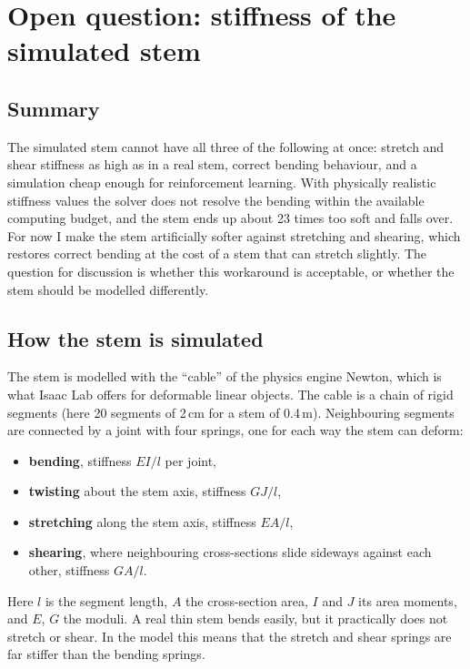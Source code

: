 \documentclass[11pt,a4paper]{article}
\begin{document}
\section{Open question: stiffness of the simulated stem}

\subsection{Summary}

The simulated stem cannot have all three of the following at once: stretch and shear stiffness as high as
in a real stem, correct bending behaviour, and a simulation cheap enough for reinforcement learning. With
physically realistic stiffness values the solver does not resolve the bending within the available
computing budget, and the stem ends up about 23 times too soft and falls over. For now I make the stem
artificially softer against stretching and shearing, which restores correct bending at the cost of a stem
that can stretch slightly. The question for discussion is whether this workaround is acceptable, or whether
the stem should be modelled differently.

\subsection{How the stem is simulated}

The stem is modelled with the ``cable'' of the physics engine Newton, which is what Isaac Lab offers for
deformable linear objects. The cable is a chain of rigid segments (here 20 segments of 2\,cm for a stem of
0.4\,m). Neighbouring segments are connected by a joint with four springs, one for each way the stem can
deform:
\begin{itemize}
  \item \textbf{bending}, stiffness $EI/l$ per joint,
  \item \textbf{twisting} about the stem axis, stiffness $GJ/l$,
  \item \textbf{stretching} along the stem axis, stiffness $EA/l$,
  \item \textbf{shearing}, where neighbouring cross-sections slide sideways against each other, stiffness
        $GA/l$.
\end{itemize}
Here $l$ is the segment length, $A$ the cross-section area, $I$ and $J$ its area moments, and $E$, $G$ the
moduli. A real thin stem bends easily, but it practically does not stretch or shear. In the model this
means that the stretch and shear springs are far stiffer than the bending springs.
\end{document}
